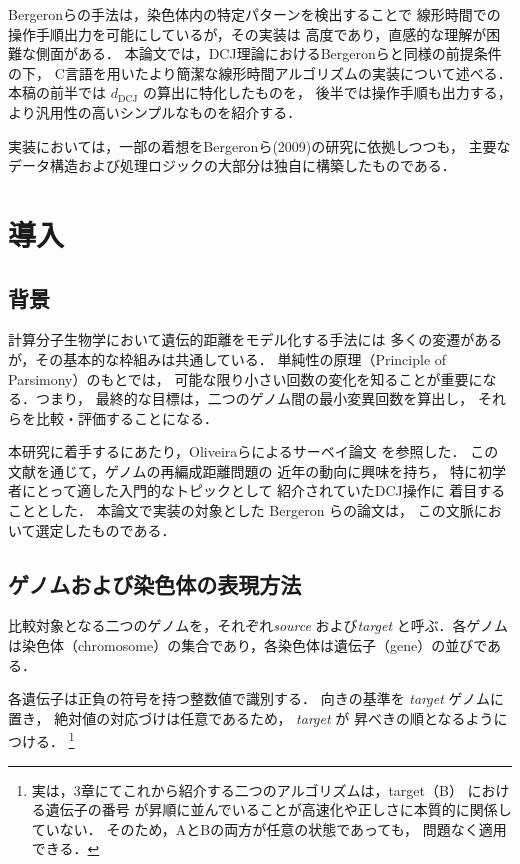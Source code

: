 \documentclass[paper=a4,fontsize=11pt,report,oneside]{jlreq}
\begin{document}
Bergeronらの手法は，染色体内の特定パターンを検出することで
線形時間での操作手順出力を可能にしているが，その実装は
高度であり，直感的な理解が困難な側面がある．
本論文では，DCJ理論におけるBergeronらと同様の前提条件の下，
C言語を用いたより簡潔な線形時間アルゴリズムの実装について述べる．
本稿の前半では $d_{\mathrm{DCJ}}$ の算出に特化したものを，
後半では操作手順も出力する，より汎用性の高いシンプルなものを紹介する．

実装においては，一部の着想をBergeronら(2009)の研究に依拠しつつも，
主要なデータ構造および処理ロジックの大部分は独自に構築したものである．

\newpage
{}

\chapter{導入}

\section{背景}
計算分子生物学において遺伝的距離をモデル化する手法には
多くの変遷があるが，その基本的な枠組みは共通している．
単純性の原理（Principle of Parsimony）のもとでは，
可能な限り小さい回数の変化を知ることが重要になる．つまり，
最終的な目標は，二つのゲノム間の最小変異回数を算出し，
それらを比較・評価することになる．

本研究に着手するにあたり，Oliveiraらによるサーベイ論文
\cite{oliveira2024}を参照した．
この文献を通じて，ゲノムの再編成距離問題の
近年の動向に興味を持ち，
特に初学者にとって適した入門的なトピックとして
紹介されていたDCJ操作に
着目することとした．
本論文で実装の対象とした Bergeron らの論文は，
この文脈において選定したものである．


\section{ゲノムおよび染色体の表現方法}

比較対象となる二つのゲノムを，それぞれ\textit{source} および\textit{target} と呼ぶ．各ゲノムは染色体（chromosome）の集合であり，各染色体は遺伝子（gene）の並びである．

各遺伝子は正負の符号を持つ整数値で識別する．
向きの基準を \textit{target} ゲノムに置き，
絶対値の対応づけは任意であるため， \textit{target} が
昇べきの順となるようにつける．
\footnote{
    実は，3章にてこれから紹介する二つのアルゴリズムは，target（B）
    における遺伝子の番号
    が昇順に並んでいることが高速化や正しさに本質的に関係していない．
    そのため，AとBの両方が任意の状態であっても，
    問題なく適用できる．
}
\end{document}
